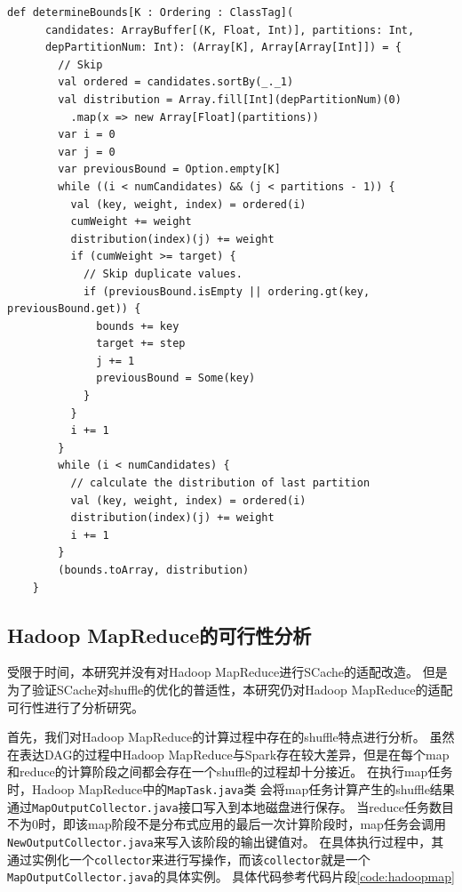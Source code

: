 \begin{lstlisting}[style={myScalastyle}, caption={水塘采样代码片段}, label={code:sample}]
    def determineBounds[K : Ordering : ClassTag](
      candidates: ArrayBuffer[(K, Float, Int)], partitions: Int,
      depPartitionNum: Int): (Array[K], Array[Array[Int]]) = {
        // Skip
        val ordered = candidates.sortBy(_._1)
        val distribution = Array.fill[Int](depPartitionNum)(0)
          .map(x => new Array[Float](partitions))
        var i = 0
        var j = 0
        var previousBound = Option.empty[K]
        while ((i < numCandidates) && (j < partitions - 1)) {
          val (key, weight, index) = ordered(i)
          cumWeight += weight
          distribution(index)(j) += weight
          if (cumWeight >= target) {
            // Skip duplicate values.
            if (previousBound.isEmpty || ordering.gt(key, previousBound.get)) {
              bounds += key
              target += step
              j += 1
              previousBound = Some(key)
            }
          }
          i += 1
        }
        while (i < numCandidates) {
          // calculate the distribution of last partition
          val (key, weight, index) = ordered(i)
          distribution(index)(j) += weight
          i += 1
        }
        (bounds.toArray, distribution)
    }
\end{lstlisting}

\subsection{Hadoop MapReduce的可行性分析}

受限于时间，本研究并没有对Hadoop MapReduce进行SCache的适配改造。
但是为了验证SCache对shuffle的优化的普适性，本研究仍对Hadoop MapReduce的适配可行性进行了分析研究。

首先，我们对Hadoop MapReduce的计算过程中存在的shuffle特点进行分析。
虽然在表达DAG的过程中Hadoop MapReduce与Spark存在较大差异，但是在每个map和reduce的计算阶段之间都会存在一个shuffle的过程却十分接近。
在执行map任务时，Hadoop MapReduce中的\verb|MapTask.java|类
会将map任务计算产生的shuffle结果通过\verb|MapOutputCollector.java|接口写入到本地磁盘进行保存。
当reduce任务数目不为0时，即该map阶段不是分布式应用的最后一次计算阶段时，map任务会调用\verb|NewOutputCollector.java|来写入该阶段的输出键值对。
在具体执行过程中，其通过实例化一个\verb|collector|来进行写操作，而该\verb|collector|就是一个\verb|MapOutputCollector.java|的具体实例。
具体代码参考代码片段\ref{code:hadoopmap}

